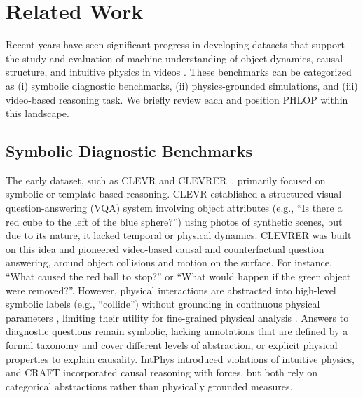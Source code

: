 \documentclass[conference]{IEEEtran}
\begin{document}

\section{Related Work}


Recent years have seen significant progress in developing datasets that support the study and evaluation of machine understanding of object dynamics, causal structure, and intuitive physics in videos \cite{yi2020clevrer,tung2023physion++}. These benchmarks can be categorized as (i) symbolic diagnostic benchmarks, (ii) physics-grounded simulations, and (iii) video-based reasoning task. We briefly review each and position PHLOP within this landscape.

\subsection{Symbolic Diagnostic Benchmarks}

The early dataset, such as CLEVR \cite{johnson2017clevr} and CLEVRER~\cite{yi2020clevrer}, primarily focused on symbolic or template-based reasoning.
CLEVR \cite{johnson2017clevr} established a structured visual question-answering (VQA) system involving object attributes (e.g., ``Is there a red cube to the left of the blue sphere?'') using photos of synthetic scenes, but due to its nature, it lacked temporal or physical dynamics.
CLEVRER \cite{yi2020clevrer} was built on this idea and pioneered video-based causal and counterfactual question answering, around object collisions and motion on the surface. For instance, ``What caused the red ball to stop?'' or ``What would happen if the green object were removed?''. However, physical interactions are abstracted into high-level symbolic labels (e.g., ``collide'') without grounding in continuous physical parameters , limiting their utility for fine-grained physical analysis \cite{yi2020clevrer}. 
Answers to diagnostic questions remain symbolic, lacking annotations that are defined by a formal taxonomy and cover different levels of abstraction, or explicit physical properties to explain causality.
IntPhys \cite{riochet2018intphys} introduced violations of intuitive physics, and CRAFT \cite{wu2020craft} incorporated causal reasoning with forces, but both rely on categorical abstractions rather than physically grounded measures.
\end{document}

